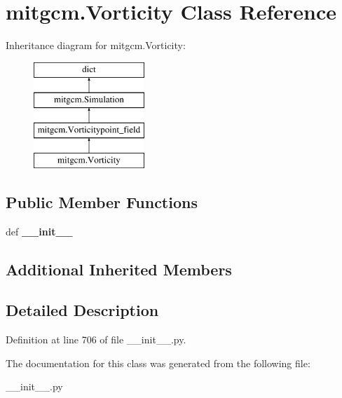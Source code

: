 \hypertarget{classmitgcm_1_1Vorticity}{\section{mitgcm.\+Vorticity Class Reference}
\label{classmitgcm_1_1Vorticity}
}
Inheritance diagram for mitgcm.\+Vorticity\+:\begin{figure}[H]
\begin{center}
\leavevmode
\includegraphics[height=4.000000cm]{classmitgcm_1_1Vorticity}
\end{center}
\end{figure}
\subsection*{Public Member Functions}
\begin{DoxyCompactItemize}
\item 
\hypertarget{classmitgcm_1_1Vorticity_a6fdcf74ea42dc79b3b8eab1eb2a149e4}{def {\bfseries \+\_\+\+\_\+init\+\_\+\+\_\+}}\label{classmitgcm_1_1Vorticity_a6fdcf74ea42dc79b3b8eab1eb2a149e4}

\end{DoxyCompactItemize}
\subsection*{Additional Inherited Members}


\subsection{Detailed Description}


Definition at line 706 of file \+\_\+\+\_\+init\+\_\+\+\_\+.\+py.



The documentation for this class was generated from the following file\+:\begin{DoxyCompactItemize}
\item 
\+\_\+\+\_\+init\+\_\+\+\_\+.\+py\end{DoxyCompactItemize}
